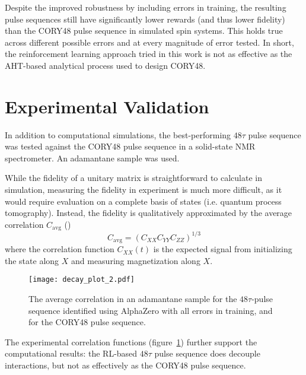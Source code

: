 Despite the improved robustness by including errors in training, the resulting pulse sequences still have significantly lower rewards (and thus lower fidelity) than the CORY48 pulse sequence in simulated spin systems. This holds true across different possible errors and at every magnitude of error tested. In short, the reinforcement learning approach tried in this work is not as effective as the AHT-based analytical process used to design CORY48.



\section{Experimental Validation}\label{sec:experimental}

In addition to computational simulations, the best-performing $48\tau$ pulse sequence was tested against the CORY48 pulse sequence in a solid-state NMR spectrometer.
An adamantane sample was used.

While the fidelity of a unitary matrix is straightforward to calculate in simulation, measuring the fidelity in experiment is much more difficult, as it would require evaluation on a complete basis of states (i.e. quantum process tomography).
Instead, the fidelity is qualitatively approximated by the average correlation $C_\text{avg}$ (\cite{peng2021deep})
\begin{equation}
    C_\text{avg} = (C_{XX} C_{YY} C_{ZZ})^{1/3}
\end{equation}
where the correlation function $C_{XX}(t)$ is the expected signal from initializing the state along $X$ and measuring magnetization along $X$.

\begin{figure}[H]
    \centering
    \texttt{[image: decay\_plot\_2.pdf]}
    \caption{The average correlation in an adamantane sample for the $48\tau$-pulse sequence identified using AlphaZero with all errors in training, and for the CORY48 pulse sequence.}
    \label{fig:decay_plot}
\end{figure}

The experimental correlation functions (figure~\ref{fig:decay_plot}) further support the computational results: the RL-based $48\tau$ pulse sequence does decouple interactions, but not as effectively as the CORY48 pulse sequence.
